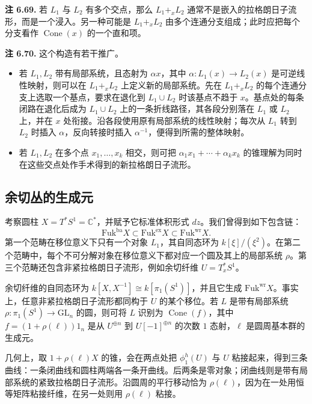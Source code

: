\begin{note}\label{note:cone-multiple-intersections}
\textbf{注 6.69.} 若 $L_1$ 与 $L_2$ 有多个交点，那么 $L_1+_xL_2$ 通常不是嵌入的拉格朗日子流形，而是一个浸入。另一种可能是 $L_1+_xL_2$ 由多个连通分支组成；此时应把每个分支看作 $\operatorname{Cone}(x)$ 的一个直和项。
\end{note}

\begin{note}\label{note:cone-extensions}
\textbf{注 6.70.} 这个构造有若干推广。
\begin{itemize}
  \item 若 $L_1,L_2$ 带有局部系统，且态射为 $\alpha x$，其中 $\alpha\colon L_1(x)\to L_2(x)$ 是可逆线性映射，则可以在 $L_1+_xL_2$ 上定义新的局部系统。先在 $L_1+_xL_2$ 的每个连通分支上选取一个基点，要求在退化到 $L_1\cup L_2$ 时该基点不趋于 $x$。基点处的每条闭路在退化后成为 $L_1\cup L_2$ 上的一条折线路径，其各段分别落在 $L_1$ 或 $L_2$ 上，并在 $x$ 处衔接。沿各段使用原有局部系统的线性映射；每次从 $L_1$ 转到 $L_2$ 时插入 $\alpha$，反向转接时插入 $\alpha^{-1}$，便得到所需的整体映射。
  \item 若 $L_1,L_2$ 在多个点 $x_1,\ldots,x_k$ 相交，则可把 $\alpha_1x_1+\cdots+\alpha_kx_k$ 的锥理解为同时在这些交点处作手术得到的新拉格朗日子流形。
\end{itemize}
\end{note}

\subsection{余切丛的生成元}\label{subsec:cotangent-generators}
考察圆柱 $X=T^*S^1=\mathbb C^*$，并赋予它标准体积形式 $dz$。我们曾得到如下包含链：
\[
  \mathrm{Fuk}^{\mathrm{ba}}X\subset \mathrm{Fuk}^{\mathrm{ex}}X\subset \mathrm{Fuk}^{\mathrm{wr}}X.
\]
第一个范畴在移位意义下只有一个对象 $L_1$，其自同态环为 $k[\xi]/(\xi^2)$。在第二个范畴中，每个不可分解对象在移位意义下都对应一个圆及其上的局部系统 $\rho$。第三个范畴还包含非紧拉格朗日子流形，例如余切纤维 $U=T_x^*S^1$。

余切纤维的自同态环为 $k[X,X^{-1}]\cong k[\pi_1(S^1)]$，并且它生成 $\mathrm{Fuk}^{\mathrm{wr}}X$。事实上，任意非紧拉格朗日子流形都同构于 $U$ 的某个移位。若 $L$ 是带有局部系统 $\rho\colon\pi_1(S^1)\to\mathrm{GL}_n$ 的圆，则可将 $L$ 识别为 $\operatorname{Cone}(f)$，其中 $f=(1+\rho(\ell))1_n$ 是从 $U^{\oplus n}$ 到 $U[-1]^{\oplus n}$ 的次数 $1$ 态射，$\ell$ 是圆周基本群的生成元。

几何上，取 $1+\rho(\ell)X$ 的锥，会在两点处把 $\phi_1^h(U)$ 与 $U$ 粘接起来，得到三条曲线：一条闭曲线和圆柱两端各一条开曲线。后两条是零对象；闭曲线则是带有局部系统的紧致拉格朗日子流形。沿圆周的平行移动恰为 $\rho(\ell)$，因为在一处用恒等矩阵粘接纤维，在另一处则用 $\rho(\ell)$ 粘接。

